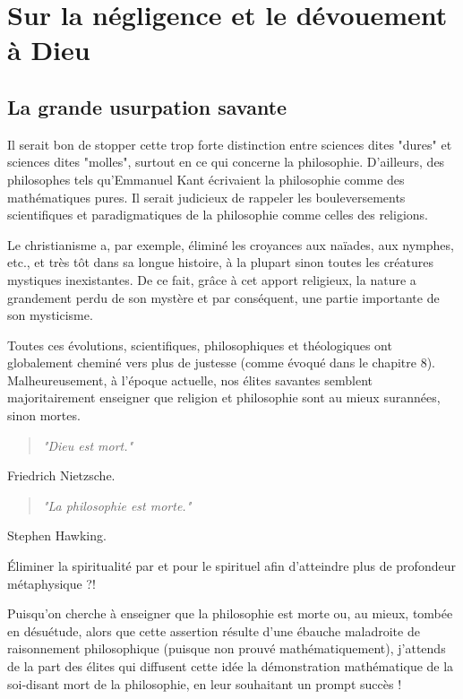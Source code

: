 \part{Sur la négligence et le dévouement à Dieu}

\chapter{La grande usurpation savante}

Il serait bon de stopper cette trop forte distinction entre sciences dites "dures" et sciences dites "molles", surtout en ce qui concerne la philosophie. D'ailleurs, des philosophes tels qu'Emmanuel Kant écrivaient la philosophie comme des mathématiques pures. Il serait judicieux de rappeler les bouleversements scientifiques et paradigmatiques de la philosophie comme celles des religions.

Le christianisme a, par exemple, éliminé les croyances aux naïades, aux nymphes, etc., et très tôt dans sa longue histoire, à la plupart sinon toutes les créatures mystiques inexistantes. De ce fait, grâce à cet apport religieux, la nature a grandement perdu de son mystère et par conséquent, une partie importante de son mysticisme.

Toutes ces évolutions, scientifiques, philosophiques et théologiques ont globalement cheminé vers plus de justesse (comme évoqué dans le chapitre 8). Malheureusement, à l'époque actuelle, nos élites savantes semblent majoritairement enseigner que religion et philosophie sont au mieux surannées, sinon mortes.


\begin{center}
\begin{quote}
\textit{"Dieu est mort."}\end{quote} Friedrich Nietzsche.
\end{center}



\begin{center}
\begin{quote}
\textit{"La philosophie est morte."}\end{quote} Stephen Hawking.

\end{center}


\'Eliminer la spiritualité par et pour le spirituel afin d'atteindre plus de profondeur métaphysique ?!

Puisqu'on cherche à enseigner que la philosophie est morte ou, au mieux, tombée en désuétude, alors que cette assertion résulte d'une ébauche maladroite de raisonnement philosophique (puisque non prouvé mathématiquement), j'attends de la part des élites qui diffusent cette idée la démonstration mathématique de la soi-disant mort de la philosophie, en leur souhaitant un prompt succès !

